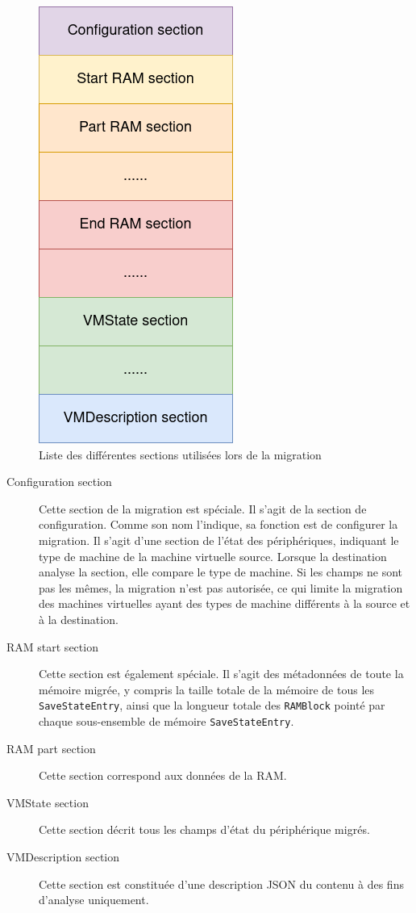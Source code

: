 \begin{figure}[H]
    \centering
    \includegraphics[scale=0.4]{include/section.png}
    \caption{Liste des différentes sections utilisées lors de la migration}
\end{figure}

\begin{description}
    \item[Configuration section]
    Cette section de la migration est spéciale.
    Il s'agit de la section de configuration.
    Comme son nom l'indique, sa fonction est de configurer la migration.
    Il s'agit d'une section de l'état des périphériques, indiquant le type de machine de la machine virtuelle source.
    Lorsque la destination analyse la section, elle compare le type de machine.
    Si les champs ne sont pas les mêmes, la migration n'est pas autorisée, ce qui limite la migration des machines virtuelles ayant des types de machine différents à la source et à la destination.
    \item[RAM start section]
    Cette section est également spéciale.
    Il s'agit des métadonnées de toute la mémoire migrée, y compris la taille totale de la mémoire de tous les \texttt{SaveStateEntry}, ainsi que la longueur totale des \texttt{RAMBlock} pointé par chaque sous-ensemble de mémoire \texttt{SaveStateEntry}.

    \item[RAM part section]
    Cette section correspond aux données de la RAM.

    \item[VMState section]
    Cette section décrit tous les champs d'état du périphérique migrés.

    \item[VMDescription section]
    Cette section est constituée d'une description JSON du contenu à des fins d'analyse uniquement.

\end{description}

